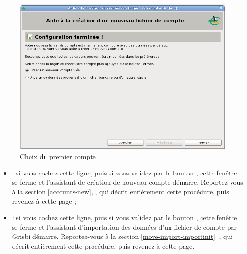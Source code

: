 \begin{enumerate}
\ifIllustration
\begin{figure}[ht]
\begin{center}
\includegraphics[scale=0.5]{image/screenshot/start_account_choice}
\end{center}
\caption{Choix du premier compte}
\label{start-account-choice-img}
\end{figure}
\fi

		\begin{itemize}
			\item {} : si vous cochez cette ligne, puis si vous validez par le bouton , cette fenêtre se ferme et l'assistant de création de nouveau compte démarre. Reportez-vous à la section \vref{accounts-new}, , qui décrit entièrement cette procédure, puis revenez à cette page ;

			\item {} : si vous cochez cette ligne, puis si vous validez par le bouton , cette fenêtre se ferme et l'assistant d'importation des données d'un fichier de compte par Grisbi démarre. Reportez-vous à la section \vref{move-import-importinit}, , qui décrit entièrement cette procédure, puis revenez à cette page.
		\end{itemize}
\end{enumerate}

\label{start-newfile-end}

